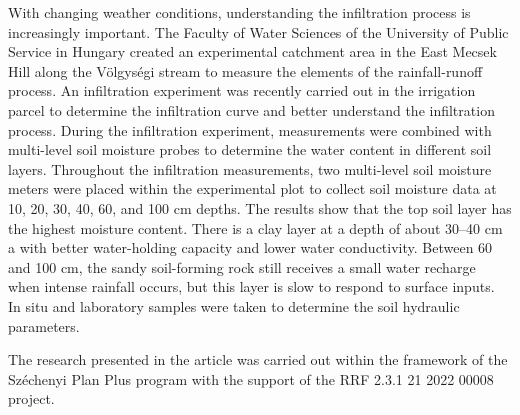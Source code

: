 With changing weather conditions, understanding the infiltration process is increasingly important. The Faculty of Water Sciences of the University of Public Service in Hungary created an experimental catchment area in the East Mecsek Hill along the Völgységi stream to measure the elements of the rainfall-runoff process. An infiltration experiment was recently carried out in the irrigation parcel to determine the infiltration curve and better understand the infiltration process. During the infiltration experiment, measurements were combined with multi-level soil moisture probes to determine the water content in different soil layers. Throughout the infiltration measurements, two multi-level soil moisture meters were placed within the experimental plot to collect soil moisture data at 10, 20, 30, 40, 60, and 100 cm depths. The results show that the top soil layer has the highest moisture content. There is a clay layer at a depth of about 30–40 cm a with better water-holding capacity and lower water conductivity. Between 60 and 100 cm, the sandy soil-forming rock still receives a small water recharge when intense rainfall occurs, but this layer is slow to respond to surface inputs. In situ and laboratory samples were taken to determine the soil hydraulic parameters.

The research presented in the article was carried out within the framework of the Széchenyi Plan Plus program with the support of the RRF 2.3.1 21 2022 00008 project. 






 
\newpage{}
{}
\begin{flushleft}







\end{flushleft}

